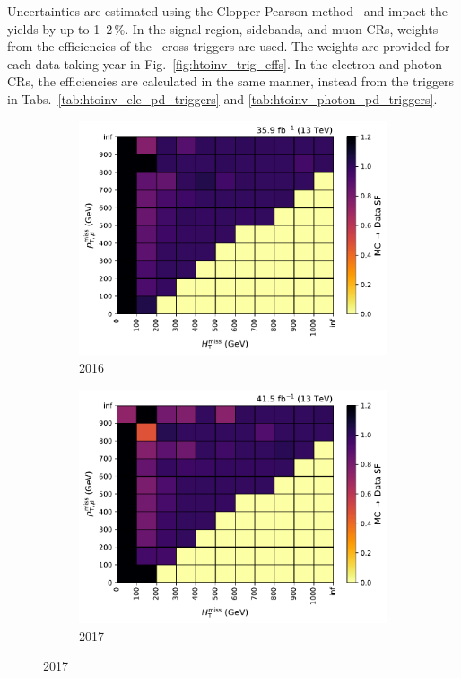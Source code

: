 Uncertainties are estimated using the Clopper-Pearson method~\cite{10.1093/biomet/26.4.404} and impact the yields by up to 1--2\,\%. In the signal region, sidebands, and muon \glspl{CR}, weights from the efficiencies of the \ptmiss--\mht cross triggers are used. The weights are provided for each data taking year in Fig.~\ref{fig:htoinv_trig_effs}. In the electron and photon \glspl{CR}, the efficiencies are calculated in the same manner, instead from the triggers in Tabs.~\ref{tab:htoinv_ele_pd_triggers} and \ref{tab:htoinv_photon_pd_triggers}.

\begin{figure}[htbp]
    \centering
    \begin{subfigure}[b]{0.48\textwidth}
        \includegraphics[width=\textwidth]{figures/trigger_efficiencies/2016/SFs.pdf}
        \caption{2016}
    \end{subfigure}
    \hfill
    \begin{subfigure}[b]{0.48\textwidth}
        \includegraphics[width=\textwidth]{figures/trigger_efficiencies/2017/SFs.pdf}
        \caption{2017}
    \end{subfigure}


\end{figure}
